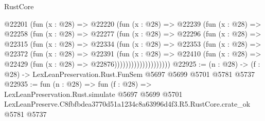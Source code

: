 \begin{lexlean}{RustCore}
\begin{coremodule}
                @22201
                  (fun (x : @28) =>
                  @22220
                    (fun (x : @28) =>
                    @22239
                      (fun (x : @28) =>
                      @22258
                        (fun (x : @28) =>
                        @22277
                          (fun (x : @28) =>
                          @22296
                            (fun (x : @28) =>
                            @22315
                              (fun (x : @28) =>
                              @22334
                                (fun (x : @28) =>
                                @22353
                                  (fun (x : @28) =>
                                  @22372
                                    (fun (x : @28) =>
                                    @22391
                                      (fun (x : @28) =>
                                      @22410
                                        (fun (x : @28) =>
                                        @22429 (fun (x : @28) => @22876))))))))))))))))))))
@22925 := (n : @28) -> (f : @28) -> LexLeanPreservation.Rust.FunSem @5697 @5699 @5701 @5781 @5737
@22935 := fun (n : @28) =>
  fun (f : @28) =>
  LexLeanPreservation.Rust.simulate
    @5697
    @5699
    @5701
    LexLeanPreserve.C8fbfbdea3770d51a1234c8a63996d4f3.R5.RustCore.crate_ok
    @5781
    @5737
\end{coremodule}
\end{lexlean}
